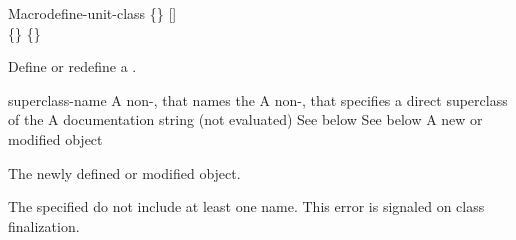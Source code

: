 \documentclass[10pt,twoside,english,pdftex]{article}
\begin{document}
\begin{functiondoc}{Macro}{define-unit-class}{ 
   \code{(}\{\}\superstar\code{)}
   [] \\
   \code{(}\{\}\superstar\code{)}
   \{\}\superstar{}
   \returns{} }
%
%
%

\fnsyntax

\fnpurpose Define or redefine a .

\fnpackage {}

\fnmodule {}

\fnargs
\begin{args}{superclass-name}
 A non-\nil,  that names the
 A non-\nil,  that specifies a
direct superclass of the    
\arg[documentation] A documentation string (not evaluated)
 See below
 See below
 A new or modified  object
\end{args}

\fnreturns The newly defined or modified  object.

\fnerrors The specified  do not include at least
one  name.  This error is signaled on class finalization.


\end{functiondoc}
\end{document}
